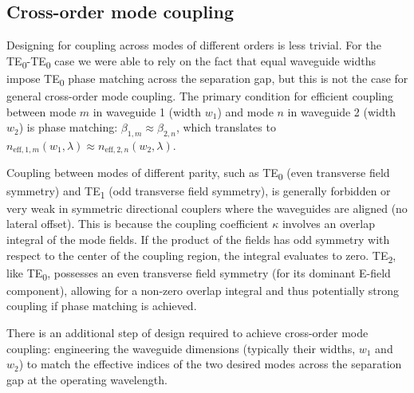 \documentclass[10pt, a4paper]{article}
\begin{document}
\subsection{Cross-order mode coupling}

Designing for coupling across modes of different orders is less trivial. 
For the TE\textsubscript{0}-TE\textsubscript{0} case we were able to rely on the fact that equal waveguide widths impose TE\textsubscript{0} phase matching across the separation gap,
but this is not the case for general cross-order mode coupling.
The primary condition for efficient coupling between mode \(m\) in waveguide 1 (width \(w_1\)) and mode \(n\) in waveguide 2 (width \(w_2\)) is phase matching: \(\beta_{1,m} \approx \beta_{2,n}\), which translates to \(n_{\text{eff},1,m}(w_1, \lambda) \approx n_{\text{eff},2,n}(w_2, \lambda)\).

Coupling between modes of different parity, such as TE\textsubscript{0} (even transverse field symmetry) and TE\textsubscript{1} (odd transverse field symmetry), is generally forbidden or very weak in symmetric directional couplers where the waveguides are aligned (no lateral offset). This is because the coupling coefficient \(\kappa\) involves an overlap integral of the mode fields. If the product of the fields has odd symmetry with respect to the center of the coupling region, the integral evaluates to zero.
TE\textsubscript{2}, like TE\textsubscript{0}, possesses an even transverse field symmetry (for its dominant E-field component), allowing for a non-zero overlap integral and thus potentially strong coupling if phase matching is achieved.

There is an additional step of design required to achieve cross-order mode coupling:
engineering the waveguide dimensions (typically their widths, \(w_1\) and \(w_2\)) to match the effective indices of the two desired modes across the separation gap at the operating wavelength.
\end{document}
